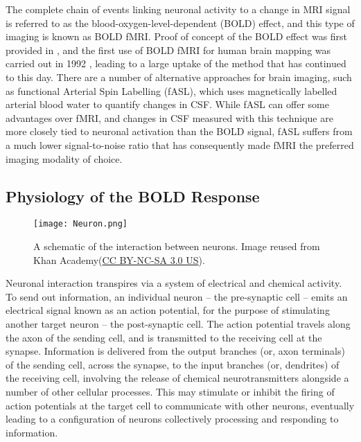 The complete chain of events linking neuronal activity to a change in MRI signal is referred to as the blood-oxygen-level-dependent (BOLD) effect, and this type of imaging is known as BOLD fMRI.  Proof of concept of the BOLD effect was first provided in \citet*{Ogawa1990-it}, and the first use of BOLD fMRI for human brain mapping was carried out in 1992 \citep{Bandettini1992-jt, Kwong1992-uq, Ogawa1992-af}, leading to a large uptake of the method that has continued to this day. There are a number of alternative approaches for brain imaging, such as functional Arterial Spin Labelling (fASL), which uses magnetically labelled arterial blood water to quantify changes in CSF. While fASL can offer some advantages over fMRI, and changes in CSF measured with this technique are more closely tied to neuronal activation than the BOLD signal, fASL suffers from a much lower signal-to-noise ratio that has consequently made fMRI the preferred imaging modality of choice. 

\subsection{Physiology of the BOLD Response}

\begin{figure}[htbp]
\centering
	\texttt{[image: Neuron.png]}	
\caption[A schematic of the interaction between neurons. Image reused from Khan Academy.]{A schematic of the interaction between neurons. Image reused from Khan Academy\footnotemark[1] (\href{https://creativecommons.org/licenses/by-nc-sa/3.0/us/}{CC BY-NC-SA 3.0 US}).}
\end{figure}


Neuronal interaction transpires via a system of electrical and chemical activity. To send out information, an individual neuron -- the pre-synaptic cell -- emits an electrical signal known as an action potential, for the purpose of stimulating another target neuron -- the post-synaptic cell. The action potential travels along the axon of the sending cell, and is transmitted to the receiving cell at the synapse. Information is delivered from the output branches (or, axon terminals) of the sending cell, across the synapse, to the input branches (or, dendrites) of the receiving cell, involving the release of chemical neurotransmitters alongside a number of other cellular processes. This may stimulate or inhibit the firing of action potentials at the target cell to communicate with other neurons, eventually leading to a configuration of neurons collectively processing and responding to information. 

